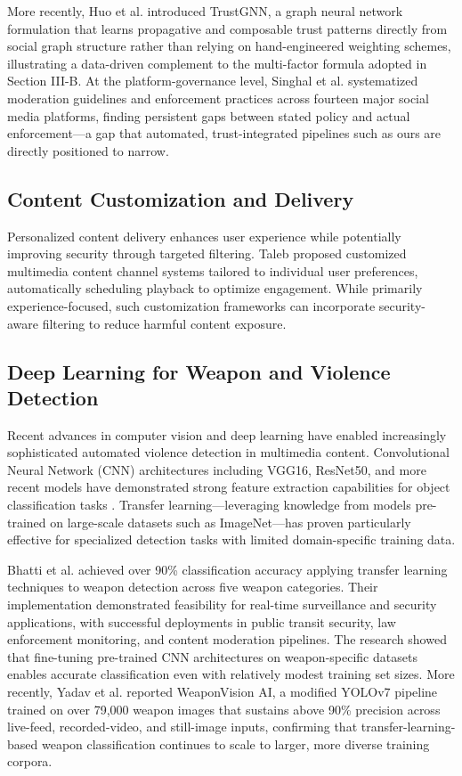 \documentclass[conference]{IEEEtran}
\begin{document}
More recently, Huo et al. \cite{huo2024trustgnn} introduced TrustGNN, a graph neural network formulation that learns propagative and composable trust patterns directly from social graph structure rather than relying on hand-engineered weighting schemes, illustrating a data-driven complement to the multi-factor formula adopted in Section III-B. At the platform-governance level, Singhal et al. \cite{singhal2023sok} systematized moderation guidelines and enforcement practices across fourteen major social media platforms, finding persistent gaps between stated policy and actual enforcement—a gap that automated, trust-integrated pipelines such as ours are directly positioned to narrow.

\subsection{Content Customization and Delivery}

Personalized content delivery enhances user experience while potentially improving security through targeted filtering. Taleb \cite{taleb2014system} proposed customized multimedia content channel systems tailored to individual user preferences, automatically scheduling playback to optimize engagement. While primarily experience-focused, such customization frameworks can incorporate security-aware filtering to reduce harmful content exposure.

\subsection{Deep Learning for Weapon and Violence Detection}

Recent advances in computer vision and deep learning have enabled increasingly sophisticated automated violence detection in multimedia content. Convolutional Neural Network (CNN) architectures including VGG16, ResNet50, and more recent models have demonstrated strong feature extraction capabilities for object classification tasks \cite{jablonski2018dynamic}. Transfer learning—leveraging knowledge from models pre-trained on large-scale datasets such as ImageNet—has proven particularly effective for specialized detection tasks with limited domain-specific training data.

Bhatti et al. \cite{bhatti2021weapon} achieved over 90\% classification accuracy applying transfer learning techniques to weapon detection across five weapon categories. Their implementation demonstrated feasibility for real-time surveillance and security applications, with successful deployments in public transit security, law enforcement monitoring, and content moderation pipelines. The research showed that fine-tuning pre-trained CNN architectures on weapon-specific datasets enables accurate classification even with relatively modest training set sizes. More recently, Yadav et al. \cite{yadav2025weaponvision} reported WeaponVision AI, a modified YOLOv7 pipeline trained on over 79{,}000 weapon images that sustains above 90\% precision across live-feed, recorded-video, and still-image inputs, confirming that transfer-learning-based weapon classification continues to scale to larger, more diverse training corpora.
\end{document}
